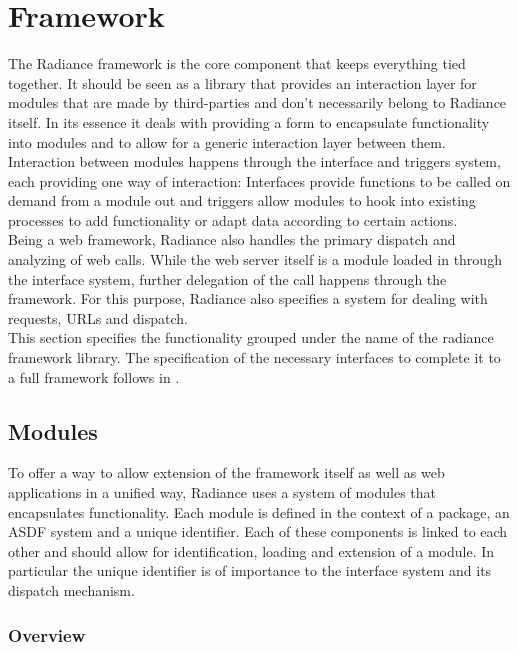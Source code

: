\chapter{Framework}\label{sec:framework}
The Radiance framework is the core component that keeps everything tied together. It should be seen as a library that provides an interaction layer for modules that are made by third-parties and don't necessarily belong to Radiance itself. In its essence it deals with providing a form to encapsulate functionality into modules and to allow for a generic interaction layer between them. \\

Interaction between modules happens through the interface and triggers system, each providing one way of interaction: Interfaces provide functions to be called on demand from a module out and triggers allow modules to hook into existing processes to add functionality or adapt data according to certain actions. \\

Being a web framework, Radiance also handles the primary dispatch and analyzing of web calls. While the web server itself is a module loaded in through the interface system, further delegation of the call happens through the framework. For this purpose, Radiance also specifies a system for dealing with requests, URLs and dispatch. \\

This section specifies the functionality grouped under the name of the radiance framework library. The specification of the necessary interfaces to complete it to a full framework follows in .

\section{Modules}\label{sec:modules}
To offer a way to allow extension of the framework itself as well as web applications in a unified way, Radiance uses a system of modules that encapsulates functionality. Each module is defined in the context of a package, an ASDF system and a unique identifier. Each of these components is linked to each other and should allow for identification, loading and extension of a module. In particular the unique identifier is of importance to the interface system and its dispatch mechanism.
\subsection{Overview}
